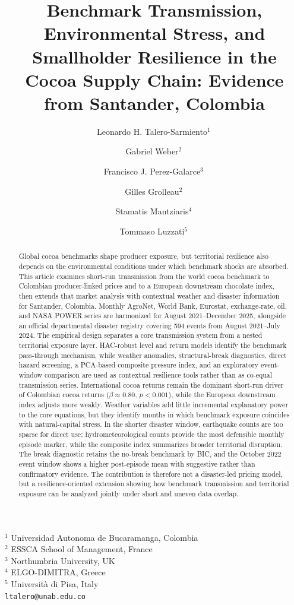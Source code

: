 \documentclass[11pt]{article}
\title{Benchmark Transmission, Environmental Stress, and Smallholder Resilience in the Cocoa Supply Chain: Evidence from Santander, Colombia}
\author{
Leonardo H. Talero-Sarmiento$^{1}$\,\orcidlink{0000-0002-4129-9163} \and
Gabriel Weber$^{2}$\,\orcidlink{0000-0003-2120-1648} \and
Francisco J. Perez-Galarce$^{3}$\,\orcidlink{0000-0002-6921-298X} \and
Gilles Grolleau$^{2}$\,\orcidlink{0000-0003-2932-8870} \and
Stamatis Mantziaris$^{4}$\,\orcidlink{0000-0001-7047-1447} \and
Tommaso Luzzati$^{5}$\,\orcidlink{0000-0003-3835-7243}
}
\date{}
\begin{document}
\maketitle
\begin{center}
\small
$^{1}$ Universidad Autonoma de Bucaramanga, Colombia \\
$^{2}$ ESSCA School of Management, France \\
$^{3}$ Northumbria University, UK \\
$^{4}$ ELGO-DIMITRA, Greece \\
$^{5}$ Università di Pisa, Italy \\

\texttt{ltalero@unab.edu.co}
\end{center}

\begin{abstract}
Global cocoa benchmarks shape producer exposure, but territorial resilience also depends on the environmental conditions under which benchmark shocks are absorbed. This article examines short-run transmission from the world cocoa benchmark to Colombian producer-linked prices and to a European downstream chocolate index, then extends that market analysis with contextual weather and disaster information for Santander, Colombia. Monthly AgroNet, World Bank, Eurostat, exchange-rate, oil, and NASA POWER series are harmonized for August 2021--December 2025, alongside an official departmental disaster registry covering 594 events from August 2021--July 2024. The empirical design separates a core transmission system from a nested territorial exposure layer. HAC-robust level and return models identify the benchmark pass-through mechanism, while weather anomalies, structural-break diagnostics, direct hazard screening, a PCA-based composite pressure index, and an exploratory event-window comparison are used as contextual resilience tools rather than as co-equal transmission series. International cocoa returns remain the dominant short-run driver of Colombian cocoa returns ($\beta \approx 0.80$, $p<0.001$), while the European downstream index adjusts more weakly. Weather variables add little incremental explanatory power to the core equations, but they identify months in which benchmark exposure coincides with natural-capital stress. In the shorter disaster window, earthquake counts are too sparse for direct use; hydrometeorological counts provide the most defensible monthly episode marker, while the composite index summarizes broader territorial disruption. The break diagnostic retains the no-break benchmark by BIC, and the October 2022 event window shows a higher post-episode mean with suggestive rather than confirmatory evidence. The contribution is therefore not a disaster-led pricing model, but a resilience-oriented extension showing how benchmark transmission and territorial exposure can be analyzed jointly under short and uneven data overlap.
\end{abstract}
\end{document}
